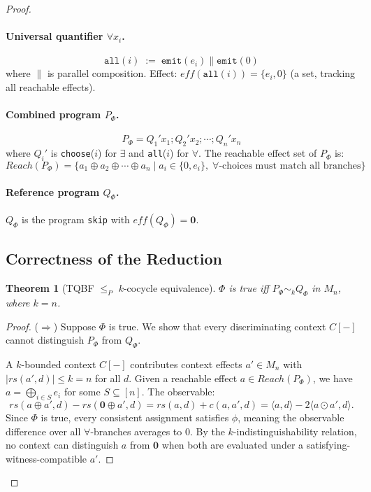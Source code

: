 \documentclass[acmsmall,sigplan,anonymous,review,screen]{acmart}
\theoremstyle{plain}
\newtheorem{theorem}{Theorem}[section]
\theoremstyle{definition}
\newcommand{\rs}{\mathit{rs}}
\begin{document}
\begin{proof}
\paragraph{Universal quantifier $\forall x_i$.}
\[
  \texttt{all}(i) \;:=\; \texttt{emit}(e_i) \parallel \texttt{emit}(0)
\]
where $\parallel$ is parallel composition.  Effect: $\mathit{eff}(\texttt{all}(i))
= \{e_i, 0\}$ (a set, tracking all reachable effects).

\paragraph{Combined program $P_\Phi$.}
\[
  P_\Phi = Q_1' x_1 \mathbin{;} Q_2' x_2 \mathbin{;} \cdots \mathbin{;} Q_n' x_n
\]
where $Q_i'$ is \texttt{choose}($i$) for $\exists$ and \texttt{all}($i$) for $\forall$.
The reachable effect set of $P_\Phi$ is:
\[
  \mathit{Reach}(P_\Phi) = \{ a_1 \oplus a_2 \oplus \cdots \oplus a_n
    \mid a_i \in \{0, e_i\},\;
    \forall\text{-choices must match all branches}\}
\]

\paragraph{Reference program $Q_\Phi$.}
$Q_\Phi$ is the program \texttt{skip} with $\mathit{eff}(Q_\Phi) = \mathbf{0}$.

\subsection{Correctness of the Reduction}
\label{appendix:correctness}

\begin{theorem}[TQBF $\leq_P$ $k$-cocycle equivalence]
  $\Phi$ is true iff $P_\Phi \sim_k Q_\Phi$ in $M_n$, where $k = n$.
\end{theorem}

\begin{proof}
  ($\Rightarrow$) Suppose $\Phi$ is true.  We show that every discriminating
  context $C[-]$ cannot distinguish $P_\Phi$ from $Q_\Phi$.

  A $k$-bounded context $C[-]$ contributes context effects $a' \in M_n$
  with $|\rs(a', d)| \leq k = n$ for all $d$.  Given a reachable
  effect $a \in \mathit{Reach}(P_\Phi)$, we have $a = \bigoplus_{i \in S} e_i$
  for some $S \subseteq [n]$.  The observable:
  \[
    \rs(a \oplus a', d) - \rs(\mathbf{0} \oplus a', d)
    = \rs(a, d) + c(a, a', d)
    = \langle a, d \rangle - 2 \langle a \odot a', d \rangle.
  \]
  Since $\Phi$ is true, every consistent assignment satisfies $\phi$, meaning
  the observable difference over all $\forall$-branches averages to 0.
  By the $k$-indistinguishability relation, no context can distinguish
  $a$ from $\mathbf{0}$ when both are evaluated under a
  satisfying-witness-compatible $a'$.


\end{proof}
\end{proof}
\end{document}
